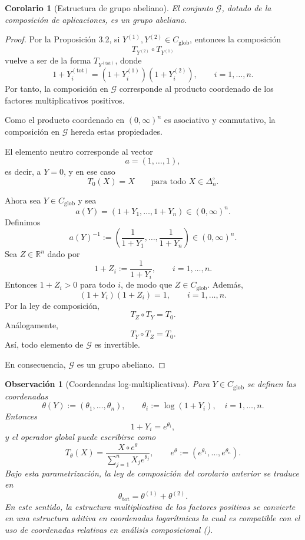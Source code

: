 \documentclass[12pt]{article}
\newtheorem{corolario}{Corolario}[section]
\newtheorem{observacion}{Observación}[section]
\begin{document}
\begin{corolario}[Estructura de grupo abeliano]
El conjunto $\mathcal G$, dotado de la composición de aplicaciones, es un grupo abeliano.
\end{corolario}

\begin{proof}
Por la Proposición 3.2, si $Y^{(1)},Y^{(2)}\in C_{\mathrm{glob}}$, entonces la composición
\[
T_{Y^{(2)}}\circ T_{Y^{(1)}}
\]
vuelve a ser de la forma $T_{Y^{(\mathrm{tot})}}$, donde
\[
1+Y_i^{(\mathrm{tot})}=(1+Y_i^{(1)})(1+Y_i^{(2)}),
\qquad i=1,\dots,n.
\]
Por tanto, la composición en $\mathcal G$ corresponde al producto coordenado de los factores multiplicativos positivos.

Como el producto coordenado en $(0,\infty)^n$ es asociativo y conmutativo, la composición en $\mathcal G$ hereda estas propiedades.

El elemento neutro corresponde al vector
\[
a=(1,\dots,1),
\]
es decir, a $Y=0$, y en ese caso
\[
T_0(X)=X
\qquad \text{para todo } X\in\Delta_n^\circ.
\]

Ahora sea $Y\in C_{\mathrm{glob}}$ y sea
\[
a(Y)=(1+Y_1,\dots,1+Y_n)\in(0,\infty)^n.
\]
Definimos
\[
a(Y)^{-1}
:=
\left(
\frac{1}{1+Y_1},\dots,\frac{1}{1+Y_n}
\right)\in(0,\infty)^n.
\]
Sea $Z\in\mathbb R^n$ dado por
\[
1+Z_i:=\frac{1}{1+Y_i},
\qquad i=1,\dots,n.
\]
Entonces $1+Z_i>0$ para todo $i$, de modo que $Z\in C_{\mathrm{glob}}$. Además,
\[
(1+Y_i)(1+Z_i)=1,
\qquad i=1,\dots,n.
\]
Por la ley de composición,
\[
T_Z\circ T_Y=T_0.
\]
Análogamente,
\[
T_Y\circ T_Z=T_0.
\]
Así, todo elemento de $\mathcal G$ es invertible.

En consecuencia, $\mathcal G$ es un grupo abeliano.
\end{proof}

\begin{observacion}[Coordenadas log-multiplicativas]\label{obs:coordenadasLog}
Para $Y\in C_{\mathrm{glob}}$ se definen las coordenadas
\[
\theta(Y) := (\theta_1,\dots,\theta_n), \qquad \theta_i := \log(1+Y_i), \quad i=1,\dots,n.
\]
Entonces
\[
1+Y_i=e^{\theta_i},
\]
y el operador global puede escribirse como
\[
T_\theta(X)
=
\frac{X\circ e^\theta}{\sum_{j=1}^n X_j e^{\theta_j}},
\qquad
e^\theta:=(e^{\theta_1},\dots,e^{\theta_n}).
\]
Bajo esta parametrización, la ley de composición del corolario anterior se traduce en
\[
\theta_{\mathrm{tot}}=\theta^{(1)}+\theta^{(2)}.
\]
En este sentido, la estructura multiplicativa de los factores positivos se convierte en una estructura aditiva en coordenadas logarítmicas la cual es compatible con el uso de coordenadas relativas en análisis composicional (\cite{Aitchison1986}).
\end{observacion}
\end{document}
